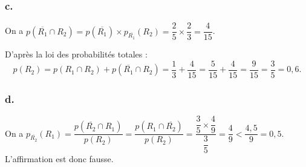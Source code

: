 \documentclass[10pt]{article}
\begin{document}
	\subsubsection*{c.}
	
	On a \(p(\overline{R_1} \cap R_2) = p(\overline{R_1}) \times p_{\overline{R_1}}(R_2) = \dfrac{2}{5} \times \dfrac{2}{3} = \dfrac{4}{15}\).
	
	D'après la loi des probabilités totales :
	\[
	p(R_2) = p(R_1 \cap R_2) + p(\overline{R_1} \cap R_2) = \dfrac{1}{3} + \dfrac{4}{15} = \dfrac{5}{15} + \dfrac{4}{15} = \dfrac{9}{15} = \dfrac{3}{5} = 0,6.
	\]
	
	\subsubsection*{d.}
	
	On a \(p_{\overline{R_2}}(R_1) = \dfrac{p(\overline{R_2} \cap R_1)}{p(R_2)} = \dfrac{p(R_1 \cap \overline{R_2})}{p(R_2)} = \dfrac{\dfrac{3}{5} \times \dfrac{4}{9}}{\dfrac{3}{5}} = \dfrac{4}{9} < \dfrac{4,5}{9} = 0,5\).\\
	 L'affirmation est donc fausse.
\end{document}

